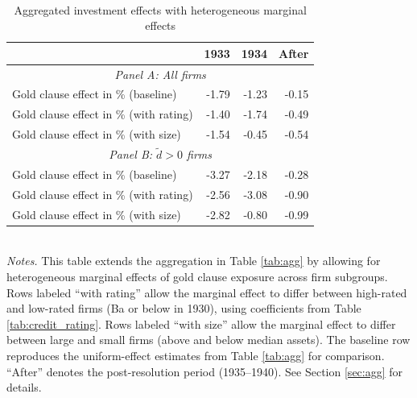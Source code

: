 \begin{table}[p]\centering
    \caption{\\Aggregated investment effects with heterogeneous marginal effects}\footnotesize
    \label{tabapp:agg_het}
    \begin{tabular}{lrrr}
    \toprule
    & 1933 & 1934 & After \\
    \midrule
    \multicolumn{4}{c}{\textit{Panel A: All firms}}\\
    \midrule
    Gold clause effect in \% (baseline)      & -1.79 & -1.23 & -0.15 \\
    Gold clause effect in \% (with rating)      & -1.40 & -1.74 & -0.49 \\
    Gold clause effect in \% (with size)      & -1.54 & -0.45 & -0.54 \\
    \midrule
    \multicolumn{4}{c}{\textit{Panel B: $\tilde{d}>0$ firms}}\\
    \midrule
    Gold clause effect in \% (baseline)      & -3.27 & -2.18 & -0.28 \\
    Gold clause effect in \% (with rating)      & -2.56 & -3.08 & -0.90 \\
    Gold clause effect in \% (with size)      & -2.82 & -0.80 & -0.99 \\
    \bottomrule

    \end{tabular}\\

    \vspace*{3mm} \justifying \noindent
\footnotesize{\textit{Notes.} This table extends the aggregation in Table \ref{tab:agg} by allowing for heterogeneous marginal effects of gold clause exposure across firm subgroups. Rows labeled ``with rating'' allow the marginal effect to differ between high-rated and low-rated firms (Ba or below in 1930), using coefficients from Table \ref{tab:credit_rating}. Rows labeled ``with size'' allow the marginal effect to differ between large and small firms (above and below median assets). The baseline row reproduces the uniform-effect estimates from Table \ref{tab:agg} for comparison. ``After'' denotes the post-resolution period (1935--1940). See Section \ref{sec:agg} for details.}
\end{table}